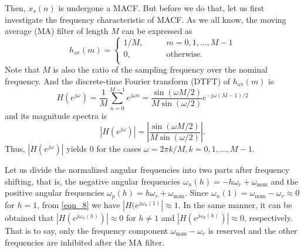\documentclass[journal,twoside]{IEEEtran}
\begin{document}
Then, $x_s(n)$ is undergone a MACF. But before we do that, let us first investigate the frequency characteristic of MACF. As we all know, the moving average (MA) filter of length $M$ can be expressed as 
\begin{equation}
h_\mathrm{av}(m)=\begin{cases}
1/M,\qquad &m=0,1,\ldots,M-1\\
0, &\text{otherwise.}\\
\end{cases}\label{eqn_6}
\end{equation}
Note that $M$ is also the ratio of the sampling frequency over the nominal frequency. And the discrete-time Fourier transform (DTFT) of $h_\mathrm{av}(m)$ is
\begin{equation}
H(e^{j\omega})=\dfrac{1}{M}\sum_{n=0}^{M-1}e^{j\omega n}=\dfrac{\sin(\omega M/2)}{M\sin(\omega/2)}e^{-j\omega (M-1)/2}\label{eqn_7}
\end{equation}
and its magnitude spectra is
\begin{equation}
|H(e^{j\omega })|=\left|\dfrac{\sin(\omega M/2)}{M\sin(\omega/2)}\right|\mathrm{.}\label{eqn_8}
\end{equation}
Thus, $|H(e^{j\omega })|$ yields $0$ for the cases $\omega=2\pi k/M,k=0,1,\ldots,M-1$.

Let us divide the normalized angular frequencies into two parts after frequency shifting, that is, the negative angular frequencies $\omega_n(h)=-h\omega_r+\omega_\mathrm{nom}$ and the positive angular frequencies $\omega_p(h)=h\omega_r+\omega_\mathrm{nom}$. Since $\omega_n(1)=\omega_\mathrm{nom}-\omega_r\approx0$ for $h=1$, from \eqref{eqn_8} we have $|H(e^{j\omega_n(1)}|\approx1$. In the same manner, it can be obtained that $|H(e^{j\omega_n(h)})|\approx0$ for $h\neq1$ and $|H(e^{j\omega_p(h)})|\approx0$, respectively. That is to say, only the frequency component $\omega_\mathrm{nom}-\omega_r$ is reserved and the other frequencies are inhibited after the MA filter.
\end{document}
